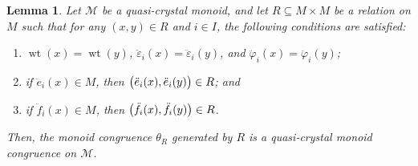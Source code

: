 \documentclass[a4paper,reqno]{amsart}
\numberwithin{equation}{section}
\theoremstyle{plain}
\newtheorem{lem}[thm]{Lemma}
\theoremstyle{definition}
\theoremstyle{remark}
\DeclarePairedDelimiter{\parens}{\lparen}{\rparen}
\DeclareMathOperator{\wt}{wt}
\newcommand*{\qcrst}[1]{\mathcal{#1}}
\newcommand*{\qKoe}{\ddot{e}}
\newcommand*{\qKof}{\ddot{f}}
\newcommand*{\qKoec}{\ddot{\varepsilon}}
\newcommand*{\qKofc}{\ddot{\varphi}}
\newcommand*{\qcmon}[1]{\qcrst{#1}}
\newcommand*{\qcrstM}{\qcmon{M}}
\begin{document}
\begin{lem}
\label{lem:qcmccongen}
Let $\qcrstM$ be a quasi-crystal monoid, and let $R \subseteq M \times M$ be a relation on $M$ such that for any $(x, y) \in R$ and $i \in I$, the following conditions are satisfied:
\begin{enumerate}
\item\label{lem:qcmccongenwtc}
$\wt(x) = \wt(y)$, $\qKoec_i (x) = \qKoec_i (y)$, and $\qKofc_i (x) = \qKofc_i (y)$;

\item\label{lem:qcmccongenqKoe}
if $\qKoe_i (x) \in M$, then $\parens[\big]{\qKoe_i (x), \qKoe_i (y)} \in R$; and

\item\label{lem:qcmccongenqKof}
if $\qKof_i (x) \in M$, then $\parens[\big]{\qKof_i (x), \qKof_i (y)} \in R$.
\end{enumerate}
Then, the monoid congruence $\theta_R$ generated by $R$ is a quasi-crystal monoid congruence on $\qcrstM$.
\end{lem}
\end{document}
